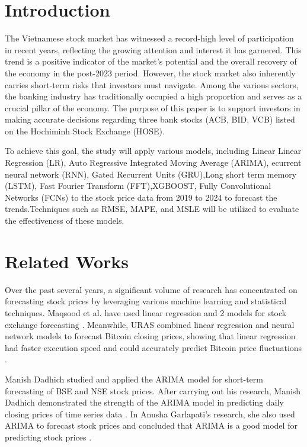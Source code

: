 \documentclass{ieeeojies}
\begin{document}
\section{Introduction}%
The Vietnamese stock market has witnessed a record-high level of participation in recent years, reflecting the growing attention and interest it has garnered. This trend is a positive indicator of the market's potential and the overall recovery of the economy in the post-2023 period. However, the stock market also inherently carries short-term risks that investors must navigate. Among the various sectors, the banking industry has traditionally occupied a high proportion and serves as a crucial pillar of the economy.
The purpose of this paper is to support investors in making accurate decisions regarding three bank stocks (ACB, BID, VCB) listed on the Hochiminh Stock Exchange (HOSE).

To achieve this goal, the study will apply various models, including Linear Linear Regression (LR), Auto Regressive Integrated Moving Average (ARIMA), ecurrent neural network (RNN), Gated Recurrent Units (GRU),Long short term memory (LSTM), Fast Fourier Transform (FFT),XGBOOST, Fully Convolutional Networks (FCNs) to the stock price data from 2019 to 2024 to forecast the trends.Techniques such as RMSE, MAPE, and MSLE will be utilized to evaluate the effectiveness of these models.
\section{Related Works}
Over the past several years, a significant volume of research has concentrated on forecasting stock prices by leveraging various machine learning and statistical techniques. Maqsood et al. have used linear regression and 2 models for stock exchange forecasting \cite{cakra2015stock}. Meanwhile, URAS combined linear regression and neural network models to forecast Bitcoin closing prices, showing that linear regression had faster execution speed and could accurately predict Bitcoin price fluctuations \cite{uras2020forecasting}.

Manish Dadhich studied and applied the ARIMA model for short-term forecasting of BSE and NSE stock prices. After carrying out his research, Manish Dadhich demonstrated the strength of the ARIMA model in predicting daily closing prices of time series data \cite{dadhich2021predictive}. In Anusha Garlapati's research, she also used ARIMA to forecast stock prices and concluded that ARIMA is a good model for predicting stock prices \cite{garlapati2021stock}.
\end{document}
